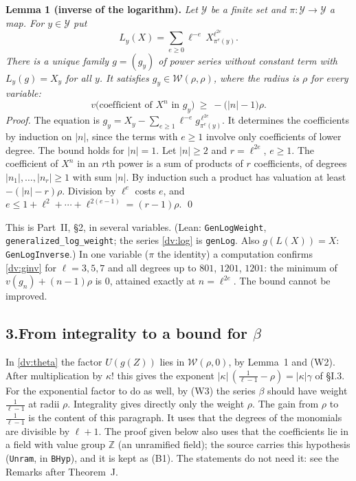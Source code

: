 \documentclass[11pt,letterpaper]{article}
\newcommand{\Z}{\mathbb Z}\newcommand{\Q}{\mathbb Q}\newcommand{\C}{\mathbb C}
\begin{document}
\textbf{Lemma 1 (inverse of the logarithm).} \emph{Let $\mathcal Y$ be a finite set and
$\pi:\mathcal Y\to\mathcal Y$ a map. For $y\in\mathcal Y$ put}
\begin{equation}\label{dv:log}
 L_y(X)=\sum_{e\ge0}\ell^{-e}\,X_{\pi^e(y)}^{\ell^{2e}} .
\end{equation}
\emph{There is a unique family $g=(g_y)$ of power series without constant term with $L_y(g)=X_y$ for all
$y$. It satisfies $g_y\in\mathcal W(\rho,\rho)$, where the radius is $\rho$ for every variable:}
\begin{equation}\label{dv:ginv}
 v\big(\text{coefficient of }X^n\text{ in }g_y\big)\ \ge\ -\big(|n|-1\big)\rho .
\end{equation}
\emph{Proof.} The equation is $g_y=X_y-\sum_{e\ge1}\ell^{-e}g_{\pi^e(y)}^{\,\ell^{2e}}$. It determines the
coefficients by induction on $|n|$, since the terms with $e\ge1$ involve only coefficients of lower degree.
The bound holds for $|n|=1$. Let $|n|\ge2$ and $r=\ell^{2e}$, $e\ge1$. The coefficient of $X^n$ in an $r$th
power is a sum of products of $r$ coefficients, of degrees $|n_1|,\ldots,|n_r|\ge1$ with sum $|n|$. By
induction such a product has valuation at least $-(|n|-r)\rho$. Division by $\ell^e$ costs $e$, and
$e\le1+\ell^2+\cdots+\ell^{2(e-1)}=(r-1)\rho$. \qed

\noindent This is Part~II, \S2, in several variables. (Lean: \texttt{GenLogWeight},
\texttt{generalized\_log\_weight}; the series \eqref{dv:log} is \texttt{genLog}. Also $g(L(X))=X$:
\texttt{GenLogInverse}.) In one variable ($\pi$ the identity) a computation confirms
\eqref{dv:ginv} for $\ell=3,5,7$ and all degrees up to $801$, $1201$, $1201$: the minimum of
$v(g_n)+(n-1)\rho$ is $0$, attained exactly at $n=\ell^{2e}$. The bound cannot be improved.

\subsection*{3.\quad From integrality to a bound for $\beta$}

In \eqref{dv:theta} the factor $U(g(Z))$ lies in $\mathcal W(\rho,0)$, by Lemma~1 and (W2). After
multiplication by $\kappa!$ this gives the exponent $|\kappa|\,(\frac1{\ell-1}-\rho)=|\kappa|\gamma$ of
\S I.3. For the exponential factor to do as well, by (W3) the series $\beta$ should have weight
$\frac1{\ell-1}$ at radii $\rho$. Integrality gives directly only the weight $\rho$. The gain from $\rho$ to
$\frac1{\ell-1}$ is the content of this paragraph. It uses that the degrees of the monomials are divisible by $\ell+1$. The proof given below also uses that the
coefficients lie in a field with value group $\Z$ (an unramified field); the source carries this hypothesis
(\texttt{Unram}, in \texttt{BHyp}), and it is kept as (B1). The statements do not need it: see the Remarks
after Theorem~J.
\end{document}
